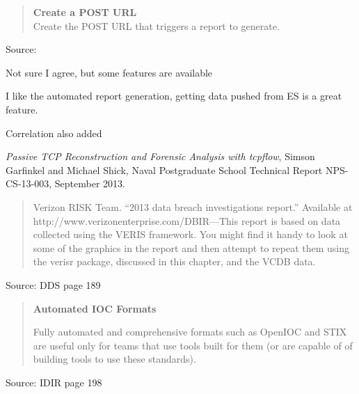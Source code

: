 \documentclass[Screen16to9,17pt]{foils}
\begin{document}

\begin{quote}{\bf
Create a POST URL}\\
Create the POST URL that triggers a report to generate.
\end{quote}
Source: 


\begin{list2}
\item Not sure I agree, but some features are available
\item I like the automated report generation, getting data pushed from ES is a great feature.
\item Correlation also added

\end{list2}





\begin{list2}
  \item {}
  \item \emph{Passive TCP Reconstruction and Forensic Analysis with tcpflow}, Simson Garfinkel and Michael Shick, Naval Postgraduate School Technical Report NPS-CS-13-003, September 2013.
\end{list2}





\begin{quote}
Verizon RISK Team. “2013 data breach investigations report.” Available at http://www.verizonenterprise.com/DBIR—This report is based on data collected using the VERIS framework. You might find it handy to look at some of the graphics in the report and then attempt to repeat them using the verisr package, discussed in this chapter, and the VCDB data.
\end{quote}
Source: DDS page 189



\begin{quote}{\bf
Automated IOC Formats}

Fully automated and comprehensive formats such as OpenIOC and STIX are useful only for teams that use tools built for them (or are capable of of building tools to use these standards).
\end{quote}
Source: IDIR page 198
\end{document}
